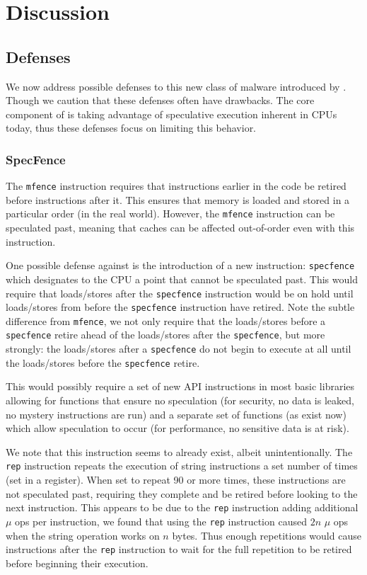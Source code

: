 
\section{Discussion}

\subsection{Defenses}
We now address possible defenses to this new class of malware introduced by
\speculake. Though we caution that these defenses often have drawbacks. The core
component of \speculake is taking advantage of speculative execution inherent in
CPUs today, thus these defenses focus on limiting this behavior.


\subsubsection{SpecFence}
The \texttt{mfence} instruction requires that instructions earlier in the code
be retired before instructions after it. This ensures that memory is loaded and
stored in a particular order (in the real world). However, the \texttt{mfence}
instruction can be speculated past, meaning that caches can be affected
out-of-order even with this instruction.

One possible defense against \speculake is the introduction of a new
instruction: \texttt{specfence} which designates to the CPU a point that cannot 
be speculated past. This would require that loads/stores after the 
\texttt{specfence} instruction would be on hold until loads/stores from before
the \texttt{specfence} instruction have retired. Note the subtle difference from
\texttt{mfence}, we not only require that the loads/stores before a
\texttt{specfence} retire ahead of the loads/stores after the 
\texttt{specfence}, but more strongly: the loads/stores after a 
\texttt{specfence} do not begin to execute at all until the loads/stores before
the \texttt{specfence} retire.

This would possibly require a set of new API instructions in most basic
libraries allowing for functions that ensure no speculation (for security, no
data is leaked, no mystery instructions are run) and a separate set of functions
(as exist now) which allow speculation to occur (for performance, no sensitive
data is at risk).

We note that this instruction seems to already exist, albeit unintentionally.
The \texttt{rep} instruction repeats the execution of string instructions a set
number of times (set in a register). When set to repeat 90 or more times, these
instructions are not speculated past, requiring they complete and be retired
before looking to the next instruction. This appears to be due to the 
\texttt{rep} instruction adding additional $\mu$ ops per instruction, we found
that using the \texttt{rep} instruction caused $2n$ $\mu$ ops when the string
operation works on $n$ bytes. Thus enough repetitions would cause instructions
after the \texttt{rep} instruction to wait for the full repetition to be retired
before beginning their execution.

